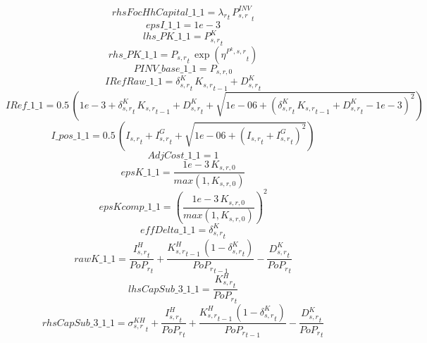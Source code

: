 \begin{dmath*}
rhsFocHhCapital\_1\_1 = {\lambda_r}_{t}\, {{P^{INV}_{s,r}}}_{t}
\end{dmath*}
\begin{dmath*}
epsI\_1\_1 = 1e-3
\end{dmath*}
\begin{dmath*}
lhs\_PK\_1\_1 = {{P^K_{s,r}}}_{t}
\end{dmath*}
\begin{dmath*}
rhs\_PK\_1\_1 = {{P_{s,r}}}_{t}\, \exp\left({{\eta^{P^k,s,r}}}_{t}\right)
\end{dmath*}
\begin{dmath*}
PINV\_base\_1\_1 = {{P_{s,r,0}}}
\end{dmath*}
\begin{dmath*}
IRefRaw\_1\_1 = {{\delta^{K}_{s,r}}}_{t}\, {{K_{s,r}}}_{t-1}+{{D^K_{s,r}}}_{t}
\end{dmath*}
\begin{dmath*}
IRef\_1\_1 = 0.5\, \left(1e-3+{{\delta^{K}_{s,r}}}_{t}\, {{K_{s,r}}}_{t-1}+{{D^K_{s,r}}}_{t}+\sqrt{1e-06+\left({{\delta^{K}_{s,r}}}_{t}\, {{K_{s,r}}}_{t-1}+{{D^K_{s,r}}}_{t}-1e-3\right)^{2}}\right)
\end{dmath*}
\begin{dmath*}
I\_pos\_1\_1 = 0.5\, \left({{I_{s,r}}}_{t}+{{I^G_{s,r}}}_{t}+\sqrt{1e-06+\left({{I_{s,r}}}_{t}+{{I^G_{s,r}}}_{t}\right)^{2}}\right)
\end{dmath*}
\begin{dmath*}
AdjCost\_1\_1 = 1
\end{dmath*}
\begin{dmath*}
epsK\_1\_1 = \frac{1e-3\, {{K_{s,r,0}}}}{max(1,{{K_{s,r,0}}})}
\end{dmath*}
\begin{dmath*}
epsKcomp\_1\_1 = \left(\frac{1e-3\, {{K_{s,r,0}}}}{max(1,{{K_{s,r,0}}})}\right)^{2}
\end{dmath*}
\begin{dmath*}
effDelta\_1\_1 = {{\delta^{K}_{s,r}}}_{t}
\end{dmath*}
\begin{dmath*}
rawK\_1\_1 = \frac{{{I^H_{s,r}}}_{t}}{{{PoP_r}}_{t}}+\frac{{{K^H_{s,r}}}_{t-1}\, \left(1-{{\delta^{K}_{s,r}}}_{t}\right)}{{{PoP_r}}_{t-1}}-\frac{{{D^K_{s,r}}}_{t}}{{{PoP_r}}_{t}}
\end{dmath*}
\begin{dmath*}
lhsCapSub\_3\_1\_1 = \frac{{{K^H_{s,r}}}_{t}}{{{PoP_r}}_{t}}
\end{dmath*}
\begin{dmath*}
rhsCapSub\_3\_1\_1 = {{\sigma^{KH}_{s,r}}}_{t}+\frac{{{I^H_{s,r}}}_{t}}{{{PoP_r}}_{t}}+\frac{{{K^H_{s,r}}}_{t-1}\, \left(1-{{\delta^{K}_{s,r}}}_{t}\right)}{{{PoP_r}}_{t-1}}-\frac{{{D^K_{s,r}}}_{t}}{{{PoP_r}}_{t}}
\end{dmath*}
